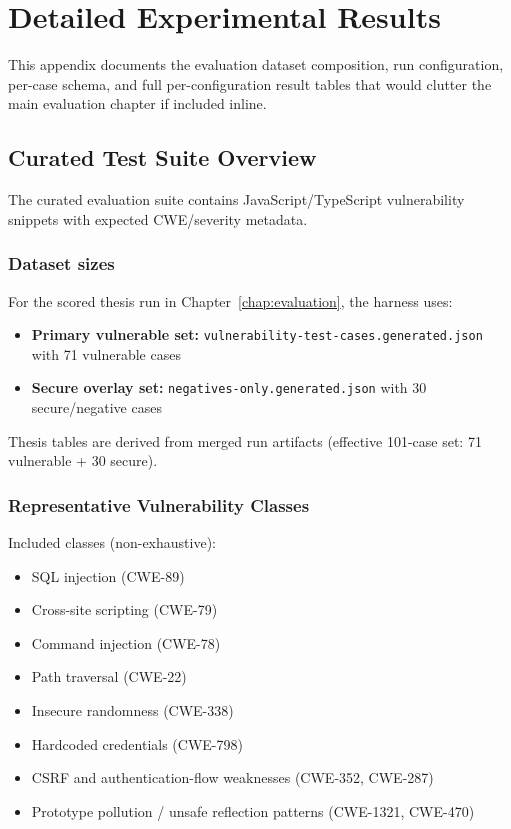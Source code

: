 \chapter{Detailed Experimental Results}
\label{appendix:eval-details}
\label{appendix:experimental-results}

This appendix documents the evaluation dataset composition, run configuration, per-case schema, and full per-configuration result tables that would clutter the main evaluation chapter if included inline.

\section{Curated Test Suite Overview}
\label{app:dataset-overview}

The curated evaluation suite contains JavaScript/TypeScript vulnerability snippets with expected CWE/severity metadata.

\subsection*{Dataset sizes}

For the scored thesis run in Chapter~\ref{chap:evaluation}, the harness uses:
\begin{itemize}
  \item \textbf{Primary vulnerable set:} \texttt{vulnerability-test-cases.generated.json} with 71 vulnerable cases
  \item \textbf{Secure overlay set:} \texttt{negatives-only.generated.json} with 30 secure/negative cases
\end{itemize}
Thesis tables are derived from merged run artifacts (effective 101-case set: 71 vulnerable + 30 secure).

\subsection*{Representative Vulnerability Classes}

Included classes (non-exhaustive):
\begin{itemize}
  \item SQL injection (CWE-89)
  \item Cross-site scripting (CWE-79)
  \item Command injection (CWE-78)
  \item Path traversal (CWE-22)
  \item Insecure randomness (CWE-338)
  \item Hardcoded credentials (CWE-798)
  \item CSRF and authentication-flow weaknesses (CWE-352, CWE-287)
  \item Prototype pollution / unsafe reflection patterns (CWE-1321, CWE-470)
\end{itemize}

